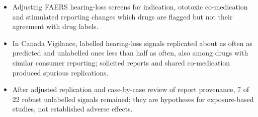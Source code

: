 \begin{itemize}
\item Adjusting FAERS hearing-loss screens for indication, ototoxic co-medication and stimulated reporting changes which drugs
are flagged but not their agreement with drug labels.
\item In Canada Vigilance, labelled hearing-loss signals replicated about as often as predicted and unlabelled ones less than half
as often, also among drugs with similar consumer reporting; solicited reports and shared co-medication produced spurious
replications.
\item After adjusted replication and case-by-case review of report provenance, 7 of 22 robust unlabelled signals
remained; they are hypotheses for exposure-based studies, not established adverse effects.
\end{itemize}